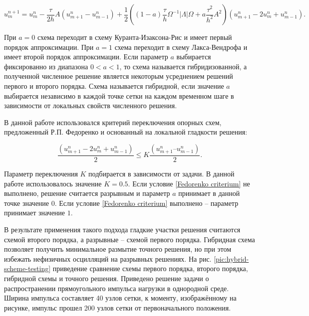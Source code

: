 \begin{equation}
	\label{hybrid scheme}
	u^{n+1}_m = u^n_m - \frac{\tau}{2h} A (u^n_{m+1} - u^n_{m-1})
	 + \frac{1}{2} ((1-a) \frac{\tau}{h} \Omega^{-1} |\Lambda| \Omega
	 + a \frac{\tau^2}{h^2} A^2 ) (u^n_{m+1} - 2u^n_m + u^n_{m-1}).
\end{equation}

При $a = 0$ схема переходит в схему Куранта-Изаксона-Рис и имеет первый порядок аппроксимации. При $a = 1$ схема переходит в схему Лакса-Вендрофа и имеет второй порядок аппроксимации. Если параметр $a$ выбирается фиксированно из диапазона $0 < a < 1$, то схема называется гибридизованной, а полученной численное решение является некоторым усреднением решений первого и второго порядка. Схема называется гибридной, если значение $a$ выбирается независимо в каждой точке сетки на каждом временном шаге в зависимости от локальных свойств численного решения.

В данной работе использовался критерий переключения опорных схем, предложенный Р.П. Федоренко и основанный на локальной гладкости решения:

\begin{equation}
	\label{Fedorenko criterium}
	\frac{(u^n_{m+1} - 2u^n_m + u^n_{m-1})}{2} \le K \frac{(u^n_{m+1} – u^n_{m-1})}{2} .
\end{equation}

Параметр переключения $K$ подбирается в зависимости от задачи. В данной работе использовалось значение $K = 0.5$. Если условие \ref{Fedorenko criterium} не выполнено, решение считается разрывным и параметр $a$ принимает в данной точке значение $0$. Если условие \ref{Fedorenko criterium} выполнено -- параметр принимает значение $1$.

В результате применения такого подхода гладкие участки решения считаются схемой второго порядка, а разрывные -- схемой первого порядка. Гибридная схема позволяет получить минимальное размытие точного решения, но при этом избежать нефизичных осцилляций на разрывных решениях. На рис. \ref{pic:hybrid-scheme-testing} приведение сравнение схемы первого порядка, второго порядка, гибридной схемы и точного решения. Приведено решение задачи о распространении прямоугольного импульса нагрузки в однородной среде. Ширина импульса составляет 40 узлов сетки, к моменту, изображённому на рисунке, импульс прошел 200 узлов сетки от первоначального положения.

